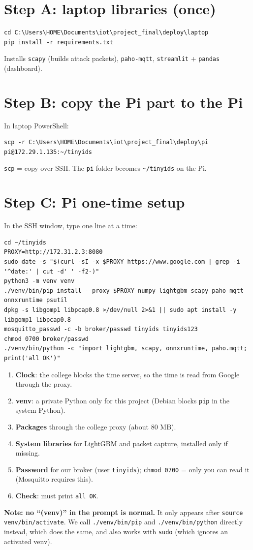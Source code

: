 \documentclass[11pt]{article}
\begin{document}
\newpage
\section{Step A: laptop libraries (once)}
\begin{Verbatim}[frame=single]
cd C:\Users\HOME\Documents\iot\project_final\deploy\laptop
pip install -r requirements.txt
\end{Verbatim}
Installs \texttt{scapy} (builds attack packets), \texttt{paho-mqtt}, \texttt{streamlit} + \texttt{pandas} (dashboard).

\section{Step B: copy the Pi part to the Pi}
In laptop PowerShell:
\begin{Verbatim}[frame=single,fontsize=\small]
scp -r C:\Users\HOME\Documents\iot\project_final\deploy\pi pi@172.29.1.135:~/tinyids
\end{Verbatim}
\texttt{scp} = copy over SSH. The \texttt{pi} folder becomes \texttt{\textasciitilde/tinyids} on the Pi.

\section{Step C: Pi one-time setup}
In the SSH window, type one line at a time:
\begin{Verbatim}[frame=single,fontsize=\footnotesize]
cd ~/tinyids
PROXY=http://172.31.2.3:8080
sudo date -s "$(curl -sI -x $PROXY https://www.google.com | grep -i '^date:' | cut -d' ' -f2-)"
python3 -m venv venv
./venv/bin/pip install --proxy $PROXY numpy lightgbm scapy paho-mqtt onnxruntime psutil
dpkg -s libgomp1 libpcap0.8 >/dev/null 2>&1 || sudo apt install -y libgomp1 libpcap0.8
mosquitto_passwd -c -b broker/passwd tinyids tinyids123
chmod 0700 broker/passwd
./venv/bin/python -c "import lightgbm, scapy, onnxruntime, paho.mqtt; print('all OK')"
\end{Verbatim}
\begin{enumerate}
\item \textbf{Clock}: the college blocks the time server, so the time is read from Google through the proxy.
\item \textbf{venv}: a private Python only for this project (Debian blocks \texttt{pip} in the system Python).
\item \textbf{Packages} through the college proxy (about 80 MB).
\item \textbf{System libraries} for LightGBM and packet capture, installed only if missing.
\item \textbf{Password} for our broker (user \texttt{tinyids}); \texttt{chmod 0700} = only you can read it (Mosquitto requires this).
\item \textbf{Check}: must print \texttt{all OK}.
\end{enumerate}
\textbf{Note: no ``(venv)'' in the prompt is normal.} It only appears after \texttt{source venv/bin/activate}. We call \texttt{./venv/bin/pip} and
\texttt{./venv/bin/python} directly instead, which does the same, and also works with \texttt{sudo} (which ignores an activated venv).
\end{document}
